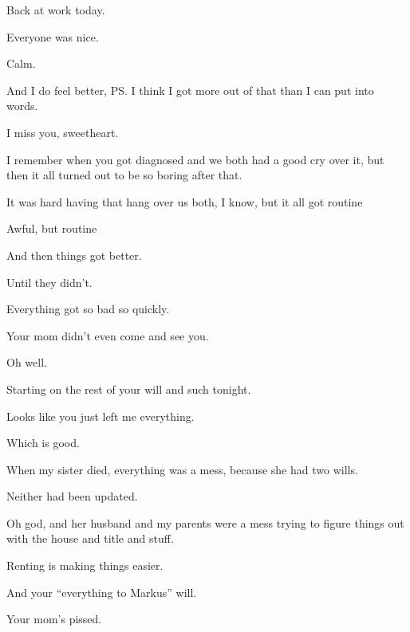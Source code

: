 { Back at work today.

 Everyone was nice.

 Calm.

 And I do feel better, PS. I think I got more out of that than I can put into words.

\newpage

\nopagebreak

 I miss you, sweetheart.

 I remember when you got diagnosed and we both had a good cry over it, but then it all turned out to be so boring after that.

 It was hard having that hang over us both, I know, but it all got routine

 Awful, but routine

 And then things got better.

 Until they didn't.

 Everything got so bad so quickly.

 Your mom didn't even come and see you.

 Oh well.

 Starting on the rest of your will and such tonight.

 Looks like you just left me everything.

 Which is good.

 When my sister died, everything was a mess, because she had two wills.

 Neither had been updated.

 Oh god, and her husband and my parents were a mess trying to figure things out with the house and title and stuff.

 Renting is making things easier.

 And your ``everything to Markus'' will.

 Your mom's pissed.

\nopagebreak

}
